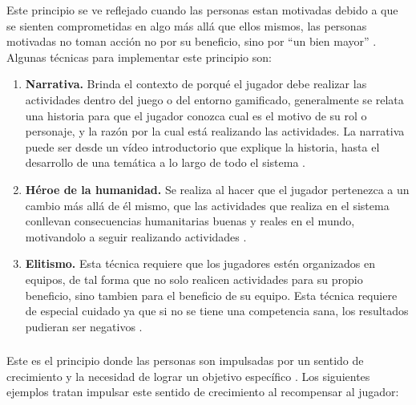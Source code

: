  \noindent Este principio se ve reflejado cuando las personas estan motivadas debido a que se
 sienten comprometidas en algo más allá que ellos mismos, las personas motivadas no toman acción
 no por su beneficio, sino por ``un bien mayor'' \cite[p. 66, 69]{Octalysis}. Algunas técnicas
 para implementar este principio son:
    
    \begin{enumerate}
    \item
    {\bf Narrativa.}
        Brinda el contexto de porqué el jugador debe realizar las actividades dentro del juego o
        del entorno gamificado, generalmente se relata una historia para que el jugador conozca
        cual es el motivo de su rol o personaje, y la razón por la cual está realizando las
        actividades. La narrativa puede ser desde un vídeo introductorio que explique la
        historia, hasta el desarrollo de una temática a lo largo de todo el sistema
        \cite[p. 81]{Octalysis}.
        
    \item
    {\bf Héroe de la humanidad.}
        Se realiza al hacer que el jugador pertenezca a un cambio más allá de él mismo, que las
        actividades que realiza en el sistema conllevan consecuencias humanitarias buenas y reales
        en el mundo, motivandolo a seguir realizando actividades \cite[p. 82]{Octalysis}.
        
    \item
    {\bf Elitismo.}
        Esta técnica requiere que los jugadores estén organizados en equipos, de tal forma que
        no solo realicen actividades para su propio beneficio, sino tambien para el beneficio
        de su equipo. Esta técnica requiere de especial cuidado ya que si no se tiene una competencia
        sana, los resultados pudieran ser negativos \cite[p. 83]{Octalysis}.
    
    \end{enumerate}
    
\subsubsection{\principioII} \label{subsec:principioII}
    
 Este es el principio donde las personas son impulsadas por un sentido de crecimiento y la
 necesidad de lograr un objetivo específico \cite[p. 91]{Octalysis}. Los siguientes ejemplos
 tratan impulsar este sentido de crecimiento al recompensar al jugador:
    
